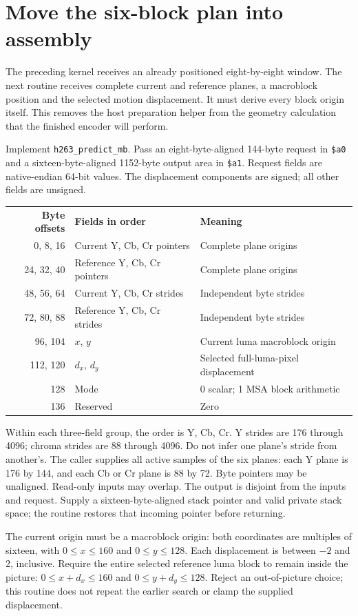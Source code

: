 \section{Move the six-block plan into assembly}
The preceding kernel receives an already positioned eight-by-eight window.
The next routine receives complete current and reference planes, a macroblock
position and the selected motion displacement. It must derive every block origin
itself. This removes the host preparation helper from the geometry calculation
that the finished encoder will perform.

Implement \texttt{h263\_predict\_mb}. Pass an eight-byte-aligned 144-byte request
in \texttt{\$a0} and a sixteen-byte-aligned 1152-byte output area in
\texttt{\$a1}. Request fields are native-endian 64-bit values. The displacement
components are signed; all other fields are unsigned.
\begin{center}
\begin{tabular}{rll}
\textbf{Byte offsets} & \textbf{Fields in order} & \textbf{Meaning}\\
0, 8, 16 & Current Y, Cb, Cr pointers & Complete plane origins\\
24, 32, 40 & Reference Y, Cb, Cr pointers & Complete plane origins\\
48, 56, 64 & Current Y, Cb, Cr strides & Independent byte strides\\
72, 80, 88 & Reference Y, Cb, Cr strides & Independent byte strides\\
96, 104 & $x$, $y$ & Current luma macroblock origin\\
112, 120 & $d_x$, $d_y$ & Selected full-luma-pixel displacement\\
128 & Mode & 0 scalar; 1 MSA block arithmetic\\
136 & Reserved & Zero
\end{tabular}
\end{center}
Within each three-field group, the order is Y, Cb, Cr. Y strides are 176 through
4096; chroma strides are 88 through 4096. Do not infer one plane's stride from
another's. The caller supplies all active samples of the six planes: each Y
plane is 176 by 144, and each Cb or Cr plane is 88 by 72. Byte pointers may be
unaligned. Read-only inputs may overlap. The output is disjoint from the inputs
and request. Supply a sixteen-byte-aligned stack pointer and valid private stack
space; the routine restores that incoming pointer before returning.

The current origin must be a macroblock origin: both coordinates are multiples
of sixteen, with $0\leq x\leq160$ and $0\leq y\leq128$. Each displacement is
between $-2$ and $2$, inclusive. Require the entire selected reference luma block
to remain inside the picture: $0\leq x+d_x\leq160$ and
$0\leq y+d_y\leq128$. Reject an out-of-picture choice; this routine does not
repeat the earlier search or clamp the supplied displacement.

